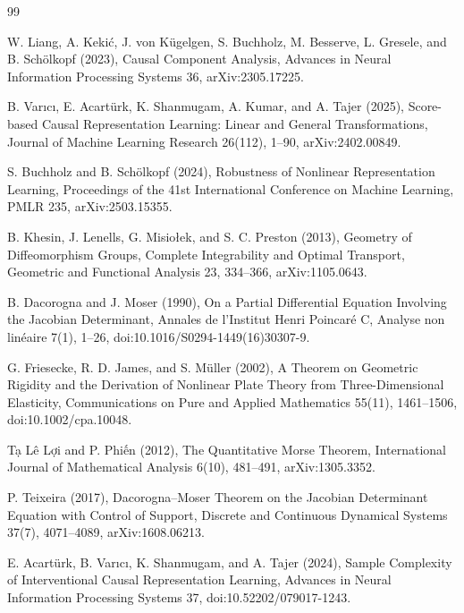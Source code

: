 \documentclass{article}
\begin{document}
\begin{thebibliography}{99}

   W. Liang, A. Kekić, J. von Kügelgen, S. Buchholz, M. Besserve, L. Gresele, and B. Schölkopf (2023), Causal Component Analysis, Advances in Neural Information Processing Systems 36, arXiv:2305.17225.

   B. Varıcı, E. Acartürk, K. Shanmugam, A. Kumar, and A. Tajer (2025), Score-based Causal Representation Learning: Linear and General Transformations, Journal of Machine Learning Research 26(112), 1--90, arXiv:2402.00849.

   S. Buchholz and B. Schölkopf (2024), Robustness of Nonlinear Representation Learning, Proceedings of the 41st International Conference on Machine Learning, PMLR 235, arXiv:2503.15355.

   B. Khesin, J. Lenells, G. Misiołek, and S. C. Preston (2013), Geometry of Diffeomorphism Groups, Complete Integrability and Optimal Transport, Geometric and Functional Analysis 23, 334--366, arXiv:1105.0643.

   B. Dacorogna and J. Moser (1990), On a Partial Differential Equation Involving the Jacobian Determinant, Annales de l'Institut Henri Poincaré C, Analyse non linéaire 7(1), 1--26, doi:10.1016/S0294-1449(16)30307-9.

   G. Friesecke, R. D. James, and S. Müller (2002), A Theorem on Geometric Rigidity and the Derivation of Nonlinear Plate Theory from Three-Dimensional Elasticity, Communications on Pure and Applied Mathematics 55(11), 1461--1506, doi:10.1002/cpa.10048.

   Tạ Lê Lợi and P. Phiến (2012), The Quantitative Morse Theorem, International Journal of Mathematical Analysis 6(10), 481--491, arXiv:1305.3352.

   P. Teixeira (2017), Dacorogna--Moser Theorem on the Jacobian Determinant Equation with Control of Support, Discrete and Continuous Dynamical Systems 37(7), 4071--4089, arXiv:1608.06213.

   E. Acartürk, B. Varıcı, K. Shanmugam, and A. Tajer (2024), Sample Complexity of Interventional Causal Representation Learning, Advances in Neural Information Processing Systems 37, doi:10.52202/079017-1243.


\end{thebibliography}
\end{document}
